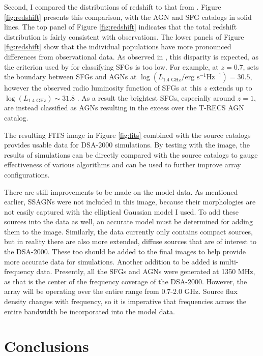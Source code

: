 \documentclass{article}
\begin{document}
\begin{multicols*}{2}
Second, I compared the distributions of redshift to that from \citet{10.1093/mnras/stw2541}. Figure \ref{fig:redshift} presents this comparison, with the AGN and SFG catalogs in solid lines. The top panel of Figure \ref{fig:redshift} indicates that the total redshift distribution is fairly consistent with observations. The lower panels of Figure \ref{fig:redshift} show that the individual populations have more pronounced differences from observational data. As observed in \citet{trecs}, this disparity is expected, as the criterion used by \citet{10.1093/mnras/stw2541} for classifying SFGs is too low. For example, at $z=0.7$, \citet{10.1093/mnras/stw2541} sets the boundary between SFGs and AGNs at $\log(L_{1.4\text{ GHz}}/\text{erg s}^{-1}\text{Hz}^{-1}) = 30.5$, however the observed radio luminosity function of SFGs at this $z$ extends up to $\log(L_{1.4\text{ GHz}}) \sim 31.8$ \citep{trecs}. As a result the brightest SFGs, especially around $z=1$, are instead classified as AGNs resulting in the excess over the T-RECS AGN catalog.

The resulting FITS image in Figure \ref{fig:fits} combined with the source catalogs provides usable data for DSA-2000 simulations. By testing with the image, the results of simulations can be directly compared with the source catalogs to gauge effectiveness of various algorithms and can be used to further improve array configurations. 

There are still improvements to be made on the model data. As mentioned earlier, SSAGNs were not included in this image, because their morphologies are not easily captured with the elliptical Gaussian model I used. To add these sources into the data as well, an accurate model must be determined for adding them to the image. Similarly, the data currently only contains compact sources, but in reality there are also more extended, diffuse sources that are of interest to the DSA-2000. These too should be added to the final images to help provide more accurate data for simulations. Another addition to be added is multi-frequency data. Presently, all the SFGs and AGNs were generated at 1350 MHz, as that is the center of the frequency coverage of the DSA-2000. However, the array will be operating over the entire range from 0.7-2.0 GHz. Source flux density changes with frequency, so it is imperative that frequencies across the entire bandwidth be incorporated into the model data.

\section{Conclusions}


\end{multicols*}
\end{document}
